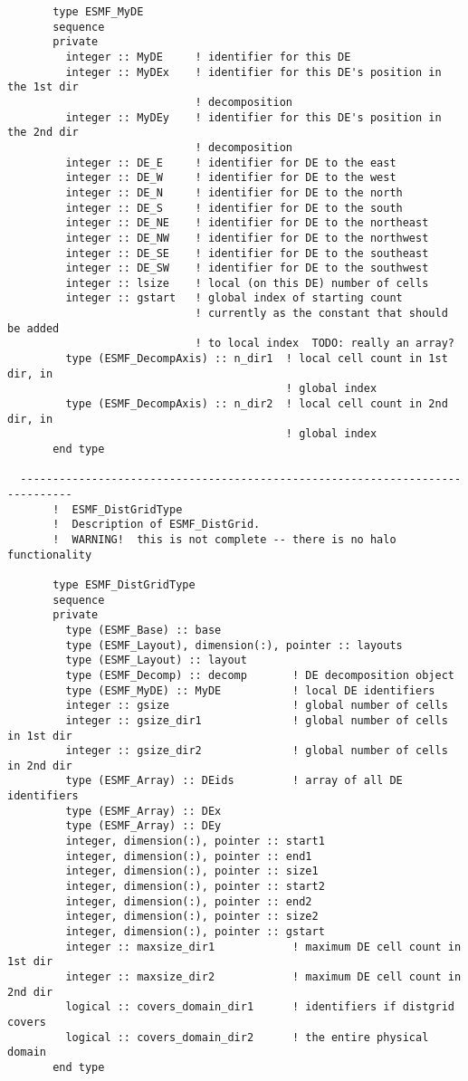 \begin{verbatim}
       type ESMF_MyDE
       sequence
       private
         integer :: MyDE     ! identifier for this DE
         integer :: MyDEx    ! identifier for this DE's position in the 1st dir
                             ! decomposition
         integer :: MyDEy    ! identifier for this DE's position in the 2nd dir
                             ! decomposition
         integer :: DE_E     ! identifier for DE to the east
         integer :: DE_W     ! identifier for DE to the west
         integer :: DE_N     ! identifier for DE to the north
         integer :: DE_S     ! identifier for DE to the south
         integer :: DE_NE    ! identifier for DE to the northeast
         integer :: DE_NW    ! identifier for DE to the northwest
         integer :: DE_SE    ! identifier for DE to the southeast
         integer :: DE_SW    ! identifier for DE to the southwest
         integer :: lsize    ! local (on this DE) number of cells
         integer :: gstart   ! global index of starting count
                             ! currently as the constant that should be added
                             ! to local index  TODO: really an array?
         type (ESMF_DecompAxis) :: n_dir1  ! local cell count in 1st dir, in
                                           ! global index
         type (ESMF_DecompAxis) :: n_dir2  ! local cell count in 2nd dir, in
                                           ! global index
       end type
 
  ------------------------------------------------------------------------------
       !  ESMF_DistGridType
       !  Description of ESMF_DistGrid. 
       !  WARNING!  this is not complete -- there is no halo functionality
 
       type ESMF_DistGridType
       sequence
       private
         type (ESMF_Base) :: base
         type (ESMF_Layout), dimension(:), pointer :: layouts
         type (ESMF_Layout) :: layout
         type (ESMF_Decomp) :: decomp       ! DE decomposition object
         type (ESMF_MyDE) :: MyDE           ! local DE identifiers
         integer :: gsize                   ! global number of cells
         integer :: gsize_dir1              ! global number of cells in 1st dir
         integer :: gsize_dir2              ! global number of cells in 2nd dir
         type (ESMF_Array) :: DEids         ! array of all DE identifiers
         type (ESMF_Array) :: DEx
         type (ESMF_Array) :: DEy
         integer, dimension(:), pointer :: start1
         integer, dimension(:), pointer :: end1
         integer, dimension(:), pointer :: size1
         integer, dimension(:), pointer :: start2
         integer, dimension(:), pointer :: end2
         integer, dimension(:), pointer :: size2
         integer, dimension(:), pointer :: gstart
         integer :: maxsize_dir1            ! maximum DE cell count in 1st dir
         integer :: maxsize_dir2            ! maximum DE cell count in 2nd dir
         logical :: covers_domain_dir1      ! identifiers if distgrid covers
         logical :: covers_domain_dir2      ! the entire physical domain
       end type
 

\end{verbatim}
